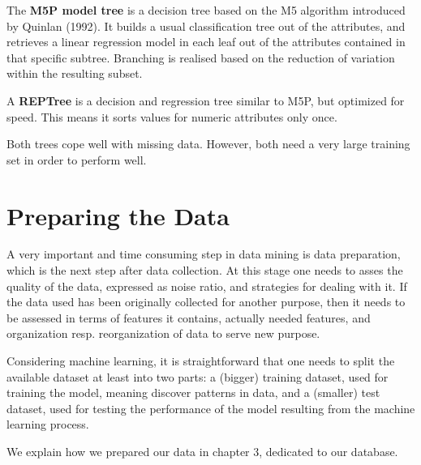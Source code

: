 \documentclass[a4paper]{scrreprt}
\begin{document}
The \textbf{M5P model tree} \cite{Witten2011} is a decision tree based on the M5 algorithm introduced by Quinlan (1992). It builds a usual classification tree out of the attributes, and retrieves a linear regression model in each leaf out of the attributes contained in that specific subtree. Branching is realised based on the reduction of variation within the resulting subset.

A \textbf{REPTree} is a decision and regression tree similar to M5P, but optimized for speed. This means it sorts values for numeric attributes only once. 

Both trees cope well with missing data. However, both need a very large training set in order to perform well.

\section{Preparing the Data}
A very important and time consuming step in data mining is data preparation, which is the next step after data collection. At this stage one needs to asses the quality of the data, expressed as noise ratio, and strategies for dealing with it. If the data used has been originally collected for another purpose, then it needs to be assessed in terms of features it contains, actually needed features, and organization resp. reorganization of data to serve new purpose. 

Considering machine learning, it is straightforward that one needs to split the available dataset at least into two parts: a (bigger) training dataset, used for training the model, meaning discover patterns in data, and a (smaller) test dataset, used for testing the performance of the model resulting from the machine learning process. 

We explain how we prepared our data in chapter 3, dedicated to our database.
\end{document}
